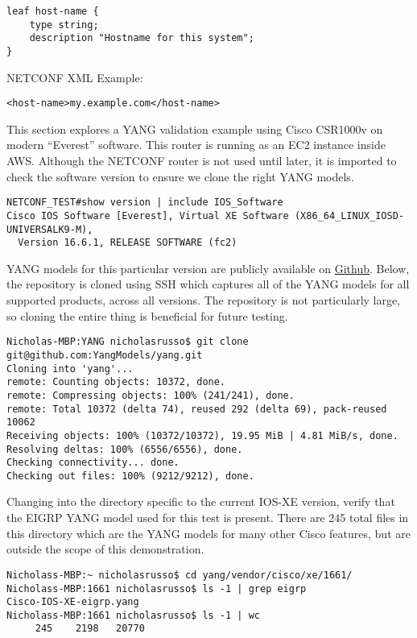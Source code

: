 \begin{verbatim}
leaf host-name {
    type string;
    description "Hostname for this system";
}
\end{verbatim}

NETCONF XML Example:
\begin{verbatim}
<host-name>my.example.com</host-name>
\end{verbatim}

This section explores a YANG validation example using Cisco CSR1000v on modern
``Everest'' software. This router is running as an EC2 instance inside AWS.
Although the NETCONF router is not used until later, it is imported to check
the software version to ensure we clone the right YANG models.

\begin{verbatim}
NETCONF_TEST#show version | include IOS_Software
Cisco IOS Software [Everest], Virtual XE Software (X86_64_LINUX_IOSD-UNIVERSALK9-M),
  Version 16.6.1, RELEASE SOFTWARE (fc2)
\end{verbatim}

YANG models for this particular version are publicly available on
\href{https://github.com/YangModels/yang/}{Github}. Below, the repository is
cloned using SSH which captures all of the YANG models for all supported
products, across all versions. The repository is not particularly large, so
cloning the entire thing is beneficial for future testing.

\begin{verbatim}
Nicholas-MBP:YANG nicholasrusso$ git clone git@github.com:YangModels/yang.git
Cloning into 'yang'...
remote: Counting objects: 10372, done.
remote: Compressing objects: 100% (241/241), done.
remote: Total 10372 (delta 74), reused 292 (delta 69), pack-reused 10062
Receiving objects: 100% (10372/10372), 19.95 MiB | 4.81 MiB/s, done.
Resolving deltas: 100% (6556/6556), done.
Checking connectivity... done.
Checking out files: 100% (9212/9212), done.
\end{verbatim}

Changing into the directory specific to the current IOS-XE version, verify
that the EIGRP YANG model used for this test is present. There are 245 total
files in this directory which are the YANG models for many other Cisco
features, but are outside the scope of this demonstration.

\begin{verbatim}
Nicholass-MBP:~ nicholasrusso$ cd yang/vendor/cisco/xe/1661/
Nicholass-MBP:1661 nicholasrusso$ ls -1 | grep eigrp
Cisco-IOS-XE-eigrp.yang
Nicholass-MBP:1661 nicholasrusso$ ls -1 | wc
     245    2198   20770
\end{verbatim}

